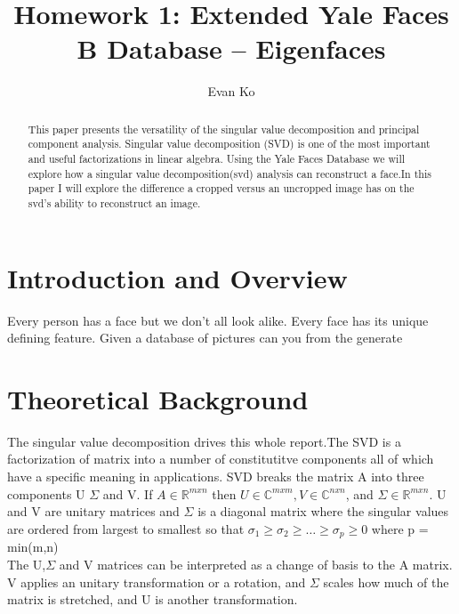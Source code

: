 \documentclass[]{article}
\title{Homework 1: Extended Yale Faces B Database – Eigenfaces}
\author{Evan Ko}
\begin{document}
	\maketitle

\begin{abstract}
This paper presents the versatility of the singular value decomposition and principal component analysis. Singular value decomposition (SVD) is one of the most important and useful factorizations in linear algebra. Using the Yale Faces Database we will explore how a singular value decomposition(svd) analysis can reconstruct a face.In this paper I will explore the difference a cropped versus an uncropped image has on the svd's ability to reconstruct an image.
\end{abstract}

\section{Introduction and Overview}
Every person has a face but we don't all look alike. Every face has its unique defining feature. Given a database of pictures can you from the generate
\section{Theoretical Background }
The singular value decomposition drives this whole report.The SVD is a factorization of matrix into a number of constitutitve components all of which have a specific meaning in applications. SVD breaks the matrix A into three components U $\Sigma$ and V. If $A\in \mathbb{R}^{mxn}$ then $U\in\mathbb{C}^{mxm},V\in\mathbb{C}^{nxn}$, and $\Sigma \in \mathbb{R}^{mxn}$. U and V are unitary matrices and $\Sigma$ is a diagonal matrix where the singular values are ordered from largest to smallest so that $\sigma_1\geq\sigma_2\geq\dots\geq\sigma_p\geq0$ where p = min(m,n)\\
The U,$\Sigma$ and V matrices can be interpreted as a change of basis to the A matrix. V applies an unitary transformation or a rotation, and $\Sigma$ scales how much of the matrix is stretched, and U is another transformation.   
\end{document}
